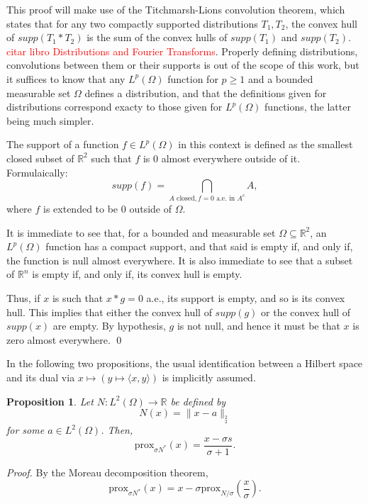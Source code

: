 \documentclass[twocolumn,twoside,a4paper,10pt]{IEEEtran}
\newtheorem{proposition}{Proposition}
\newcommand{\Frank}[1]{\textcolor{red}{#1}}
\begin{document}
This proof will make use of the Titchmarsh-Lions convolution theorem, which states that for any two compactly supported distributions \(T_1, T_2\), the convex hull of \(supp(T_1\ast T_2)\) is the sum of the convex hulls of \(supp(T_1)\) and \(supp(T_2)\). \Frank{citar libro Distributions and Fourier Transforms}. Properly defining distributions, convolutions between them or their supports is out of the scope of this work, but it suffices to know that any \(L^p(\Omega)\) function for \(p\geq 1\) and a bounded measurable set \(\Omega\) defines a distribution, and that the definitions given for distributions correspond exacty to those given for \(L^p(\Omega)\) functions, the latter being much simpler.

The support of a function \(f\in L^p(\Omega)\) in this context is defined as the smallest closed subset of \(\mathbb{R}^2\) such that \(f\) is \(0\) almost everywhere outside of it. Formulaically:
\[
  supp(f) = \bigcap_{A \text{ closed}, f=0 \text{ a.e. in } A^c}A
,\]
where \(f\) is extended to be \(0\) outside of \(\Omega\).

It is immediate to see that, for a bounded and measurable set \(\Omega\subseteq \mathbb{R}^2\), an \(L^p(\Omega)\) function has a compact support, and that said is empty if, and only if, the function is null almost everywhere. It is also immediate to see that a subset of \(\mathbb{R}^n\) is empty if, and only if, its convex hull is empty.

Thus, if \(x\) is such that \(x\ast g=0\) a.e., its support is empty, and so is its convex hull. This implies that either the convex hull of \(supp(g)\) or the convex hull of \(supp(x)\) are empty. By hypothesis, \(g\) is not null, and hence it must be that \(x\) is zero almost everywhere. \qed

In the following two propositions, the usual identification between a Hilbert space and its dual via \(x\mapsto(y\mapsto\langle x,y\rangle)\) is implicitly assumed.

\begin{proposition}\label{prop:proximity-square-norm}
  Let \(N\colon L^2(\Omega)\to \mathbb{R}\) be defined by
  \[
    N(x) = \|x-a\|_{_2^2}
  \]
  for some \(a\in L^2(\Omega)\). Then,
  \[
  \text{prox}_{\sigma N^*}(x) = \frac{x - \sigma s}{\sigma + 1}
  .\]

\end{proposition}
\textit{Proof.}
By the Moreau decomposition theorem,
\begin{equation}\label{eq:proximity-moreau}
  \text{prox}_{\sigma N^*}(x) = x - \sigma\text{prox}_{N/\sigma}\left(\frac x\sigma\right).
\end{equation}
\end{document}
